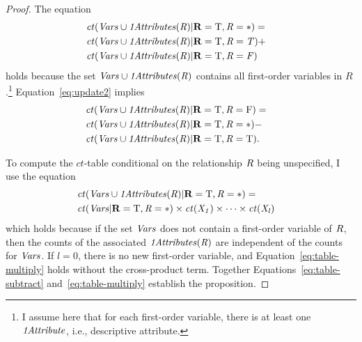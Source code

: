 \documentclass{sfuthesis}
\newcommand{\ct}{\mathit{ct}}
\begin{document}
\begin{proof}
The equation 
\begin{align}
&\ct(\Nodes  \cup \eatts(R)|\set{R} = \true, R = *) = &\label{eq:update2}  \\ 
&\ct(\Nodes  \cup \eatts(R)|\set{R} = \true, R = T)  + & \nonumber \\ 
&\ct(\Nodes  \cup \eatts(R)|\set{R} = \true, R = F) & \nonumber
\end{align}
holds because the set $\it{Vars} \cup \it{1Attributes}(R)$ contains all first-order variables in $R$.\footnote{I  assume here that  for each first-order variable, there is at least one $\it{1Attribute}$, i.e., descriptive attribute.} %
%
 Equation~\eqref{eq:update2} implies
\begin{align} 
&\ct(\Nodes  \cup \eatts(R)|\set{R} = \true, R = \false) =& \label{eq:table-subtract} \\ 
&\ct(\Nodes  \cup \eatts(R)|\set{R} = \true, R = *) -&\nonumber  \\
 & \ct(\Nodes  \cup \eatts(R)|\set{R} = \true, R = \true).& \nonumber
\end{align}

To compute the $\ct$-table conditional on the relationship $R$ being unspecified, I  use the equation
\begin{align}
&\ct(\Nodes  \cup \eatts(R)|\set{R} = \true, R = *) =  &\label{eq:table-multiply}\\
&\ct(\Nodes|\set{R} = \true, R =*) \times \ct(\X_{1}) \times \cdots \times \ct(\X_{l})& \nonumber
\end{align}
which holds because if the set $\it{Vars}$ does not contain a first-order variable of $R$, then the counts of the associated $\it{1Attributes}(R)$ are independent of the counts for $\it{Vars}$. 
If $l = 0$, there is no new first-order variable, and Equation~\eqref{eq:table-multiply} holds without  the cross-product term.
%
Together Equations~\eqref{eq:table-subtract} and~\eqref{eq:table-multiply} establish the proposition.
\end{proof}
\end{document}
